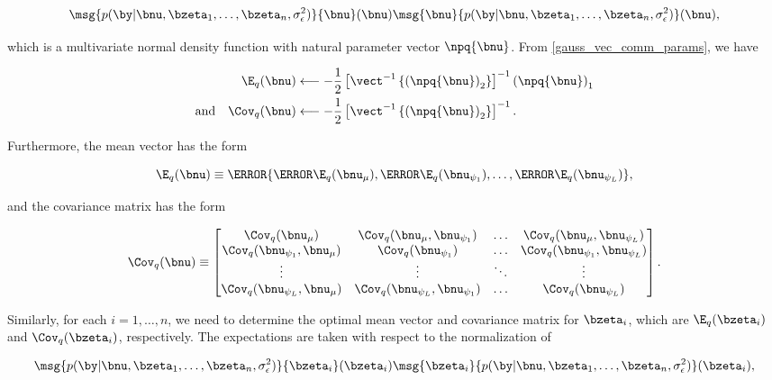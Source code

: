 \documentclass[12pt]{article}
\theoremstyle{plain}
\theoremstyle{definition}
\theoremstyle{remark}
\def\sigsqeps{\sigma^2_{\epsilon}}
\def\numu{\bnu_\mu}
\newcommand\nupsi[1]{\bnu_{\psi_{#1}}}
\begin{document}
\[
	\msg{p (\by | \bnu, \bzeta_1, \dots, \bzeta_n, \sigsqeps)}{\bnu} (\bnu)
	\msg{\bnu}{p (\by | \bnu, \bzeta_1, \dots, \bzeta_n, \sigsqeps)} (\bnu),
\]

\noindent which is a multivariate normal density function with natural parameter vector $\npq{\bnu}$.
From \eqref{gauss_vec_comm_params}, we have

\begin{align}
\begin{split}
	\E_q (\bnu)
		&\longleftarrow
			-\frac12 \left[
				\vect^{-1} \left\{
					\left( \npq{\bnu} \right)_2
				\right\}
			\right]^{-1} \left( \npq{\bnu} \right)_1 \\
	\text{and} \quad
	\Cov_q (\bnu)
		&\longleftarrow
			-\frac12 \left[
				\vect^{-1} \left\{
					\left( \npq{\bnu} \right)_2
				\right\}
			\right]^{-1}.
\end{split}
\label{mom_lik_nu}
\end{align}

\noindent Furthermore, the mean vector has the form

\begin{equation}
	\E_q (\bnu) \equiv \T{
		\left\{ \T{\E_q (\numu)}, \T{\E_q (\nupsi{1})}, \dots, \T{\E_q (\nupsi{L})} \right\}
	},
\label{exp_lik_nu}
\end{equation}

\noindent and the covariance matrix has the form

\begin{equation}
	\Cov_q (\bnu) \equiv \begin{bmatrix}
		\Cov_q (\numu) & \Cov_q (\numu, \nupsi{1}) & \dots & \Cov_q (\numu, \nupsi{L}) \\
		\Cov_q (\nupsi{1}, \numu) & \Cov_q (\nupsi{1}) & \dots & \Cov_q (\nupsi{1}, \nupsi{L}) \\
		\vdots & \vdots & \ddots & \vdots \\
		\Cov_q (\nupsi{L}, \numu) & \Cov_q (\nupsi{L}, \nupsi{1}) & \dots & \Cov_q (\nupsi{L}) \\
	\end{bmatrix}.
\label{cov_lik_nu}
\end{equation}

\noindent Similarly, for each $i = 1, \dots, n$, we need to determine the optimal mean vector and covariance matrix
for $\bzeta_i$, which are $\E_q (\bzeta_i)$ and $\Cov_q (\bzeta_i)$, respectively. The expectations are taken with
respect to the normalization of

\[
	\msg{p (\by | \bnu, \bzeta_1, \dots, \bzeta_n, \sigsqeps)}{\bzeta_i} (\bzeta_i)
	\msg{\bzeta_i}{p (\by | \bnu, \bzeta_1, \dots, \bzeta_n, \sigsqeps)} (\bzeta_i),
\]
\end{document}
